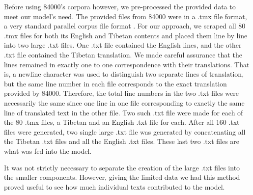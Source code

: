 \documentclass[letterpaper, 12 pt, conference]{ieeeconf}  %
\begin{document}
Before using 84000's corpora however, we pre-processed the provided data to meet our model's need. The provided files from 84000 were in a .tmx file format, a very standard parallel corpus file format \cite{c9}. 
For our approach, we scraped all 80 .tmx files for both its English and Tibetan contents and placed them line by line into two large .txt files. One .txt file contained the English lines, and the other .txt file contained the Tibetan translation. We made careful assurance that the lines remained in exactly one to one correspondence with their translations. That is, a newline character was used to distinguish two separate lines of translation, but the same line number in each file corresponds to the exact translation provided by 84000. Therefore, the total line numbers in the two .txt files were necessarily the same since one line in one file corresponding to exactly the same line of translated text in the other file. Two such .txt file were made for each of the 80 .tmx files, a Tibetan and an English .txt file for each. After all 160 .txt files were generated, two single large .txt file was generated by concatenating all the Tibetan .txt files and all the English .txt files. These last two .txt files are what was fed into the model.

It was not strictly necessary to separate the creation of the large .txt files into the smaller components. However, giving the limited data we had this method proved useful to see how much individual texts contributed to the model. 
\end{document}

